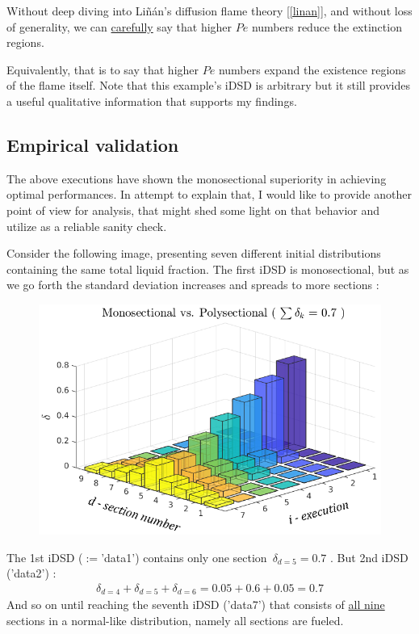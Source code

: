 \documentclass[12pt]{article}
\numberwithin{equation}{section}
\begin{document}
\begin{flushleft}
Without deep diving into Liñán's diffusion flame theory [\ref{linan}], and without loss of generality, we can \underline{carefully} say that higher $Pe$ numbers reduce the extinction regions. 

Equivalently, that is to say that higher $Pe$ numbers expand the existence regions of the flame itself. Note that this example's iDSD is arbitrary but it still provides a useful qualitative information that supports my findings. 

\subsection{Empirical validation} \label{validation}

The above executions have shown the monosectional superiority in achieving optimal performances. In attempt to explain that, I would like to provide another point of view for analysis, that might shed some light on that behavior and utilize as a reliable sanity check.

Consider the following image, presenting seven different initial distributions containing the same total liquid fraction. The first iDSD is monosectional, but as we go forth the standard deviation increases and spreads to more sections : \newline

\begin{figure}[H]
\centering
\includegraphics[width=0.75  \linewidth, center]{multi_combination_1.png}
\end{figure}
The 1st iDSD ($:=$'data1') contains only one section \,$\delta_{d=5}=0.7$ . But 2nd iDSD ('data2') :
\begin{align*}
\delta_{d=4} + \delta_{d=5} + \delta_{d=6} = 0.05 + 0.6+0.05 = 0.7
\end{align*}
And so on until reaching the seventh iDSD ('data7') that consists of \underline{all nine} sections in a normal-like distribution, namely all sections are fueled.


\end{flushleft}
\end{document}
